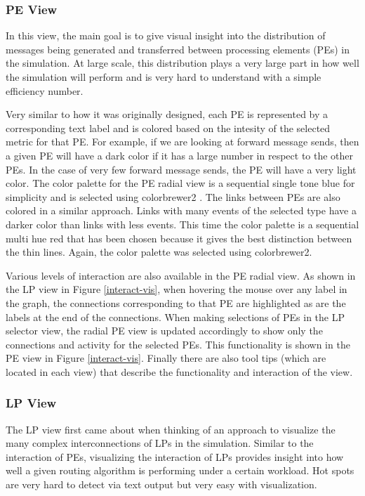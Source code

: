 \documentclass{acm_proc_article-sp}
\begin{document}
\subsubsection{PE View}
In this view, the main goal is to give visual insight into the distribution of messages being generated and transferred between processing elements (PEs) in the simulation. At large scale, this distribution plays a very large part in how well the simulation will perform and is very hard to understand with a simple efficiency number. 

Very similar to how it was originally designed, each PE is represented by a corresponding text label and is colored based on the intesity of the selected metric for that PE. For example, if we are looking at forward message sends, then a given PE will have a dark color if it has a large number in respect to the other PEs. In the case of very few forward message sends, the PE will have a very light color. The color palette for the PE radial view is a sequential single tone blue for simplicity and is selected using colorbrewer2 \cite{brewer}. The links between PEs are also colored in a similar approach. Links with many events of the selected type have a darker color than links with less events. This time the color palette is a sequential multi hue red that has been chosen because it gives the best distinction between the thin lines. Again, the color palette was selected using colorbrewer2.

Various levels of interaction are also available in the PE radial view. As shown in the LP view in Figure \ref{interact-vis}, when hovering the mouse over any label in the graph, the connections corresponding to that PE are highlighted as are the labels at the end of the connections. When making selections of PEs in the LP selector view, the radial PE view is updated accordingly to show only the connections and activity for the selected PEs. This functionality is shown in the PE view in Figure \ref{interact-vis}. Finally there are also tool tips (which are located in each view) that describe the functionality and interaction of the view.

\subsubsection{LP View}
The LP view first came about when thinking of an approach to visualize the many complex interconnections of LPs in the simulation. Similar to the interaction of PEs, visualizing the interaction of LPs provides insight into how well a given routing algorithm is performing under a certain workload. Hot spots are very hard to detect via text output but very easy with visualization. 
\end{document}
